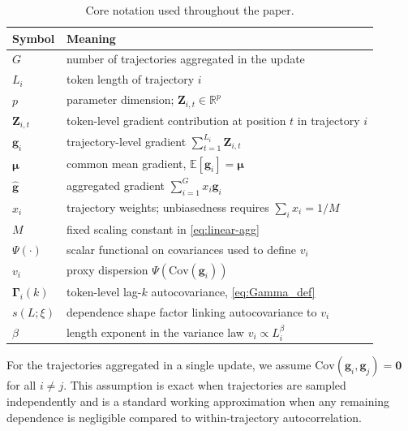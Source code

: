 \begin{table}[t]
\centering
\small
\begin{tabular}{ll}
\toprule
Symbol & Meaning \\
\midrule
$G$ & number of trajectories aggregated in the update \\
$L_i$ & token length of trajectory $i$ \\
$p$ & parameter dimension; $\boldsymbol{Z}_{i,t}\in\mathbb{R}^{p}$ \\
$\boldsymbol{Z}_{i,t}$ & token-level gradient contribution at position $t$ in trajectory $i$ \\
$\boldsymbol{g}_i$ & trajectory-level gradient $\sum_{t=1}^{L_i}\boldsymbol{Z}_{i,t}$ \\
$\boldsymbol{\mu}$ & common mean gradient, $\mathbb{E}[\boldsymbol{g}_i]=\boldsymbol{\mu}$ \\
$\widehat{\boldsymbol{g}}$ & aggregated gradient $\sum_{i=1}^{G} x_i\boldsymbol{g}_i$ \\
$x_i$ & trajectory weights; unbiasedness requires $\sum_i x_i = 1/M$ \\
$M$ & fixed scaling constant in \eqref{eq:linear-agg} \\
$\Psi(\cdot)$ & scalar functional on covariances used to define $v_i$ \\
$v_i$ & proxy dispersion $\Psi(\mathrm{Cov}(\boldsymbol{g}_i))$ \\
$\boldsymbol{\Gamma}_i(k)$ & token-level lag-$k$ autocovariance, \eqref{eq:Gamma_def} \\
$s(L;\xi)$ & dependence shape factor linking autocovariance to $v_i$ \\
$\beta$ & length exponent in the variance law $v_i\propto L_i^{\beta}$ \\
\bottomrule
\end{tabular}
\caption{Core notation used throughout the paper.}
\label{tab:notation}
\end{table}

\begin{assumption}\label{assump:cross_traj_uncorr}
For the trajectories aggregated in a single update, we assume
$\mathrm{Cov}(\boldsymbol{g}_i,\boldsymbol{g}_j)=\boldsymbol{0}$ for all $i\neq j$.
This assumption is exact when trajectories are sampled independently and is a standard working approximation when any remaining dependence is negligible compared to within-trajectory autocorrelation.
\end{assumption}

